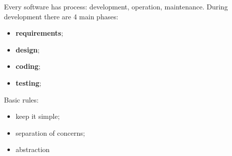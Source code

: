 \documentclass[12pt]{article}
\begin{document}
Every software has process: development, operation, maintenance. During development there are 4 main phases:
\begin{itemize}
    \item \textbf{requirements};
    \item \textbf{design};
    \item \textbf{coding};
    \item \textbf{testing};
\end{itemize}

Basic rules:
\begin{itemize}
    \item keep it simple;
    \item separation of concerns;
    \item abstraction
\end{itemize}
\end{document}
